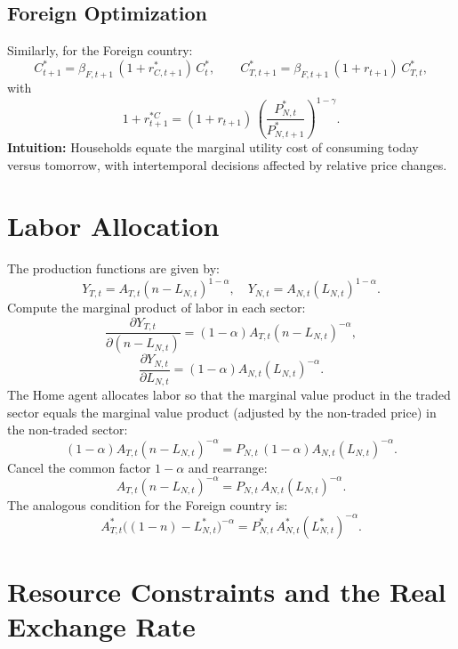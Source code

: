 \documentclass[a4paper,12pt]{article} %
\theoremstyle{nonitalic}
\begin{document}
\subsection*{Foreign Optimization}
Similarly, for the Foreign country:
\[
\boxed{C^*_{t+1} = \beta_{F,t+1}\,(1+r^*_{C,t+1})\,C^*_t, \qquad C^*_{T,t+1} = \beta_{F,t+1}\,(1+r_{t+1})\,C^*_{T,t},}
\]
with
\[
1+r_{t+1}^{*C} = (1+r_{t+1})\,\left(\frac{P^*_{N,t}}{P^*_{N,t+1}}\right)^{1-\gamma}.
\]
\textbf{Intuition:} Households equate the marginal utility cost of consuming today versus tomorrow, with intertemporal decisions affected by relative price changes.

\section{Labor Allocation}

The production functions are given by:
\[
Y_{T,t} = A_{T,t}(n-L_{N,t})^{1-\alpha}, \quad Y_{N,t} = A_{N,t}(L_{N,t})^{1-\alpha}.
\]
Compute the marginal product of labor in each sector:
\[
\frac{\partial Y_{T,t}}{\partial (n-L_{N,t})} = (1-\alpha) A_{T,t}(n-L_{N,t})^{-\alpha},
\]
\[
\frac{\partial Y_{N,t}}{\partial L_{N,t}} = (1-\alpha) A_{N,t}(L_{N,t})^{-\alpha}.
\]
The Home agent allocates labor so that the marginal value product in the traded sector equals the marginal value product (adjusted by the non-traded price) in the non-traded sector:
\[
(1-\alpha)A_{T,t}(n-L_{N,t})^{-\alpha} = P_{N,t}\,(1-\alpha)A_{N,t}(L_{N,t})^{-\alpha}.
\]
Cancel the common factor \(1-\alpha\) and rearrange:
\[
\boxed{A_{T,t}(n-L_{N,t})^{-\alpha} = P_{N,t}\,A_{N,t}(L_{N,t})^{-\alpha}.}
\]
The analogous condition for the Foreign country is:
\[
\boxed{A^*_{T,t}\big((1-n)-L^*_{N,t}\big)^{-\alpha} = P^*_{N,t}\,A^*_{N,t}(L^*_{N,t})^{-\alpha}.}
\]

\section{Resource Constraints and the Real Exchange Rate}
\end{document}
